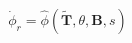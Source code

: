 \documentclass[preview]{standalone}
\begin{document}
\begin{align*}
\dot{\phi}_r = \hat{\phi}(\tilde{\mathbf{T}}, \theta, \mathbf{B}, s)
\end{align*}
\end{document}
